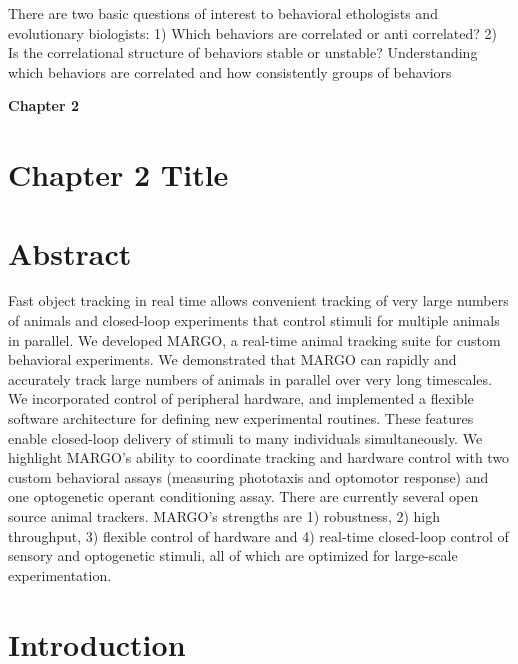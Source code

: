 \documentclass[12pt,letterpaper]{article}
\begin{document}
There are two basic questions of interest to behavioral ethologists and evolutionary biologists: 1) Which behaviors are correlated or anti correlated? 2) Is the correlational structure of behaviors stable or unstable? Understanding which behaviors are correlated and how consistently groups of behaviors


\clearpage
\begin{center}
    \Large\textbf{Chapter 2}
    \thispagestyle{empty}       %
    \clearpage
\end{center}

\section*{Chapter 2 Title}

\section*{Abstract}

Fast object tracking in real time allows convenient tracking of very large numbers of animals and closed-loop experiments that control stimuli for multiple animals in parallel. We developed MARGO, a real-time animal tracking suite for custom behavioral experiments. We demonstrated that MARGO can rapidly and accurately track large numbers of animals in parallel over very long timescales. We incorporated control of peripheral hardware, and implemented a flexible software architecture for defining new experimental routines. These features enable closed-loop delivery of stimuli to many individuals simultaneously. We highlight MARGO's ability to coordinate tracking and hardware control with two custom behavioral assays (measuring phototaxis and optomotor response) and one optogenetic operant conditioning assay. There are currently several open source animal trackers. MARGO’s strengths are 1) robustness, 2) high throughput, 3) flexible control of hardware and 4) real-time closed-loop control of sensory and optogenetic stimuli, all of which are optimized for large-scale experimentation.

\linenumbers

\section*{Introduction}
\end{document}
